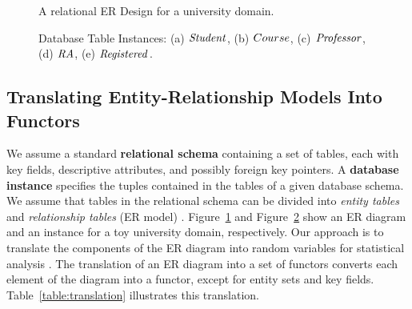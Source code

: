 \documentclass{acm_proc_article-sp}
\begin{document}
\begin{figure}[htbp] %
 \centering
{} 
\caption{A relational ER Design for a university domain.}
 \label{fig:university-schema}
\end{figure}
\begin{figure}[htbp] %
 \centering
{} 
\caption{Database Table Instances: (a) $\mathit{Student}$, (b) $Course$, (c) $\mathit{Professor}$, (d) $\mathit{RA}$, (e) $\mathit{Registered}$.  
}
 \label{fig:instance}
\end{figure}


\subsection{Translating Entity-Relationship Models Into Functors}
 We assume a standard \textbf{relational schema} containing a set of tables, each with key fields, %
descriptive attributes, and possibly foreign key pointers. 
A \textbf{database instance} specifies the tuples contained in the tables of a given database schema. 
We assume that tables in the relational schema can be divided into {\em entity tables} and {\em relationship tables} (ER model) \cite[Ch.2.2]{Ullman1982}.
 Figure~\ref{fig:university-schema} and Figure~\ref{fig:instance} show an ER diagram and an instance for a toy university domain, respectively. 
Our approach is to translate the components of the ER diagram into random variables for statistical analysis \cite{Heckerman+al:SRL07}. The translation of an ER diagram into a set of functors converts each element of the diagram into a functor, except for entity sets and key fields. Table~\ref{table:translation} illustrates this translation.
\end{document}

